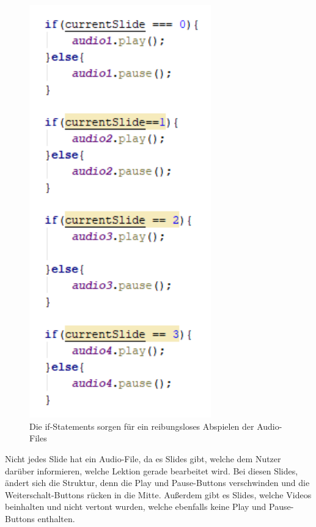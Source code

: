\begin{figure}[H] 
  \centering
     \includegraphics[width=0.7\textwidth]{webseite_abb6.png}
  \caption{Die if-Statements sorgen für ein reibungsloses Abspielen der Audio-Files}

\end{figure}

Nicht jedes Slide hat ein Audio-File, da es Slides gibt, welche dem Nutzer darüber informieren, welche Lektion gerade bearbeitet wird. Bei diesen Slides, ändert sich die Struktur, denn die Play und Pause-Buttons verschwinden und die Weiterschalt-Buttons rücken in die Mitte. Außerdem gibt es Slides, welche Videos beinhalten und nicht vertont wurden, welche ebenfalls keine Play und Pause-Buttons enthalten.

